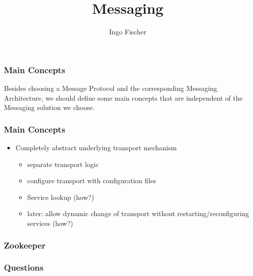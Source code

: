 \documentclass[serif,mathserif]{beamer}
\author[Ingo Fischer]{Ingo Fischer}
\title[Messaging\hspace{2em}\insertframenumber/\inserttotalframenumber]{Messaging}
\date{} %
\institute{ACME Company}
\begin{document}
\maketitle


\begin{frame}
\frametitle{Main Concepts}
Besides choosing a Message Protocol and the corresponding Messaging Architecture, 
we should define some main concepts that are independent of the Messaging solution we choose.
\end{frame}

\begin{frame}
\frametitle{Main Concepts}
\begin{itemize}
  \item Completely abstract underlying transport mechanism
  \begin{itemize}
    \item separate transport logic
    \item configure transport with configuration files
    \item Service lookup (how?)
    \item later: allow dynamic change of transport without
    restarting/reconfiguring services (how?)
  \end{itemize}
\end{itemize}
\end{frame}

\begin{frame}
\frametitle{Zookeeper}
\begin{figure}[t]
\centering
{}
\end{figure}
\end{frame}

\begin{frame}
\frametitle{Questions}
\end{frame}
\end{document}
